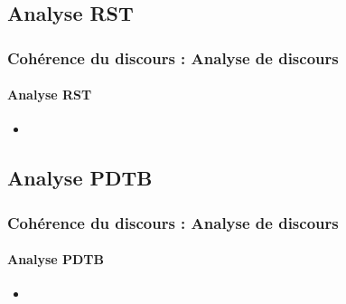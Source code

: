 \documentclass[xcolor=table]{beamer}
\begin{document}
\subsection{Analyse RST}

\begin{frame}
	\frametitle{Cohérence du discours : Analyse de discours}
	\framesubtitle{Analyse RST}
	
	\begin{itemize}
		\item 
	\end{itemize}
	
\end{frame}

\subsection{Analyse PDTB}

\begin{frame}
	\frametitle{Cohérence du discours : Analyse de discours}
	\framesubtitle{Analyse PDTB}
	
	\begin{itemize}
		\item 
	\end{itemize}
	
\end{frame}


\end{document}
